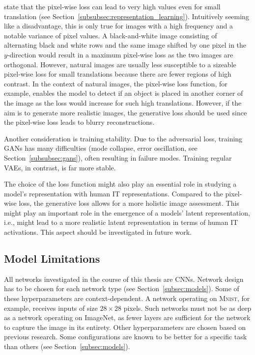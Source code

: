 \citet{larsen2015autoencoding} state that the pixel-wise loss can lead to very high values even for small translation (see Section~\ref{subsubsec:representation_learning}).
Intuitively seeming like a disadvantage, this is only true for images with a high frequency and a notable variance of pixel values.
A black-and-white image consisting of alternating black and white rows and the same image shifted by one pixel in the $y$-direction would result in a maximum pixel-wise loss as the two images are orthogonal.
However, natural images are usually less susceptible to a sizeable pixel-wise loss for small translations because there are fewer regions of high contrast.
In the context of natural images, the pixel-wise loss function, for example, enables the model to detect if an object is placed in another corner of the image as the loss would increase for such high translations.
However, if the aim is to generate more realistic images, the generative loss should be used since the pixel-wise loss leads to blurry reconstructions.

Another consideration is training stability.
Due to the adversarial loss, training \acp{GAN} has many difficulties (mode collapse, error oscillation, see Section~\ref{subsubsec:gans}), often resulting in failure modes.
Training regular \acp{VAE}, in contrast, is far more stable.

The choice of the loss function might also play an essential role in studying a model's representation with human \ac{IT} representations.
Compared to the pixel-wise loss, the generative loss allows for a more holistic image assessment.
This might play an important role in the emergence of a models' latent representation, i.e., might lead to a more realistic latent representation in terms of human IT activations.
This aspect should be investigated in future work.

\subsection{Model Limitations}\label{subsec:model-limitations}
All networks investigated in the course of this thesis are \acp{CNN}.
Network design has to be chosen for each network type (see Section~\ref{subsec:models}).
Some of these hyperparameters are context-dependent.
A network operating on \textsc{Mnist}, for example, receives inputs of size $28\times 28$ pixels.
Such networks must not be as deep as a network operating on ImageNet, as fewer layers are sufficient for the network to capture the image in its entirety.
Other hyperparameters are chosen based on previous research.
Some configurations are known to be better for a specific task than others (see Section~\ref{subsec:models}).

